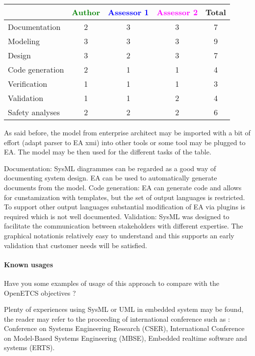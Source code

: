 \begin{tabular}{|l | c | c | c | c|}
\hline
& \textcolor{green}{Author} & \textcolor{blue}{Assessor 1} & \textcolor{magenta}{Assessor 2} & Total \\
\hline 
Documentation & 2 & 3 & 3 & 7 \\
\hline
Modeling & 3 & 3 & 3 & 9 \\
\hline
Design & 3 & 2 & 3 &  7 \\
\hline
Code generation &2 & 1 & 1 & 4 \\
\hline
Verification & 1 & 1 & 1 & 3 \\
\hline
Validation & 1 & 1 & 2 & 4 \\
\hline
Safety analyses & 2 & 2 & 2 & 6 \\
\hline
\end{tabular}
\begin{author_comment}
As said before, the model from enterprise architect may be imported
with a bit of effort (adapt parser to EA xmi) into other tools or some
tool may be plugged to EA. The model may be then used for the
different tasks of the table.
\end{author_comment}
\begin{assessor2}
Documentation: SysML diagrammes can be regarded as a good way of documenting system design. EA can be used to automatically generate documents from the model.
Code generation: EA can generate code and allows for cunstamization with templates, but the set of output languages is restricted. To support other output languages substantial modification of EA via plugins is required which is not well documented.
Validation: SysML was designed to facilitate the communication between stakeholders with different expertise. The graphical notationis relatively easy to understand and this supports an early validation that customer needs will be satisfied.
\end{assessor2}


\paragraph{Known usages} Have you some examples of usage of this
approach to  compare with the OpenETCS objectives ?

Plenty of experiences using SysML or UML in embedded system may be
found, the reader may refer to the proceeding of international
conference such as : Conference on Systems Engineering
Research (CSER), International Conference on Model-Based Systems Engineering
(MBSE), Embedded realtime software and systems (ERTS).
 


